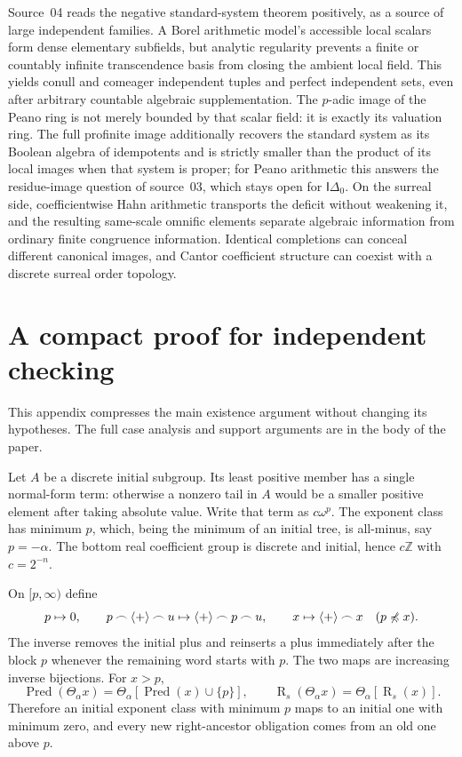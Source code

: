 \documentclass[11pt]{article}
\theoremstyle{definition}
\theoremstyle{remark}
\newcommand{\Z}{\mathbb{Z}}
\newcommand{\Pred}{\operatorname{Pred}}
\newcommand{\Rs}{\operatorname{R}_{s}}
\newcommand{\cat}{\mathbin{\frown}}
\newcommand{\plus}{\langle+\rangle}
\newcommand{\pre}{\mathrel{\preccurlyeq}}
\newcommand{\Idelta}{\mathsf{I}\Delta_0}
\begin{document}
Source~04 reads the negative standard-system theorem positively, as a
source of large independent families. A Borel arithmetic model's
accessible local scalars form dense elementary subfields, but analytic
regularity prevents a finite or countably infinite transcendence basis from
closing the ambient local field. This yields conull and comeager
independent tuples and perfect independent sets, even after arbitrary
countable algebraic supplementation. The $p$-adic image of the Peano ring
is not merely bounded by that scalar field: it is exactly its valuation
ring. The full profinite image additionally recovers the standard system as
its Boolean algebra of idempotents and is strictly smaller than the product
of its local images when that system is proper; for Peano arithmetic this
answers the residue-image question of source~03, which stays open for
$\Idelta$. On the surreal side, coefficientwise Hahn arithmetic transports
the deficit without weakening it, and the resulting same-scale omnific
elements separate algebraic information from ordinary finite congruence
information. Identical completions can conceal different canonical images,
and Cantor coefficient structure can coexist with a discrete surreal order
topology.

\appendix
\section{A compact proof for independent checking}\label{isg:app:compact}

This appendix compresses the main existence argument without changing
its hypotheses. The full case analysis and support arguments are in the
body of the paper.

Let $A$ be a discrete initial subgroup. Its least positive member has a
single normal-form term: otherwise a nonzero tail in $A$ would be a
smaller positive element after taking absolute value. Write that term
as $c\omega^p$. The exponent class has minimum $p$, which, being the
minimum of an initial tree, is all-minus, say $p=-\alpha$.
The bottom real coefficient group is discrete and initial, hence
$c\Z$ with $c=2^{-n}$.

On $[p,\infty)$ define
\[
 p\mapsto0,\qquad
 p\cat\plus\cat u\mapsto\plus\cat p\cat u,\qquad
 x\mapsto\plus\cat x\quad(p\not\pre x).
\]
The inverse removes the initial plus and reinserts a plus immediately
after the block $p$ whenever the remaining word starts with $p$.
The two maps are increasing inverse bijections. For $x>p$,
\[
 \Pred(\Theta_\alpha x)
   =\Theta_\alpha[\Pred(x)\cup\{p\}],
 \qquad
 \Rs(\Theta_\alpha x)=\Theta_\alpha[\Rs(x)].
\]
Therefore an initial exponent class with minimum $p$ maps to an initial
one with minimum zero, and every new right-ancestor obligation comes
from an old one above $p$.
\end{document}
